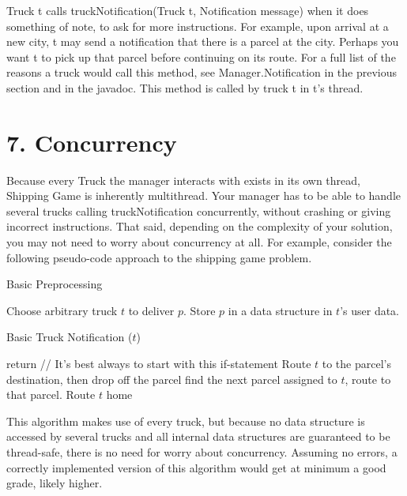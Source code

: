 \documentclass[11pt]{article}
\begin{document}
Truck t calls truckNotification(Truck t, Notification message) when it does something of note, to ask for more instructions. For example, upon arrival at a new city, t may send a notification that there is a parcel at the city. Perhaps you want t to pick up that parcel before continuing on its route. For a full list of the reasons a truck would call this method, see Manager.Notification in the previous section and in the javadoc. This method is called by truck t in t's thread. 

\section{7. Concurrency}
Because every Truck the manager interacts with exists in its own thread, Shipping Game is inherently multithread. Your manager has to be able to handle several trucks calling truckNotification concurrently, without crashing or giving incorrect instructions. That said, depending on the complexity of your solution, you may not need to worry about concurrency at all. For example, consider the following pseudo-code approach to the shipping game problem.
\begin{algorithm}
\caption{Basic Preprocessing} \label{alg:ls}
\begin{algorithmic}[1]
\STATE Choose arbitrary truck $t$ to deliver $p$. Store $p$ in a data structure in $t$'s user data.
\ENDFOR
\end{algorithmic}
\end{algorithm}
\begin{algorithm}
\caption{Basic Truck Notification ($t$)} \label{alg:ls}
\begin{algorithmic}[1]
\STATE return      // It's best always to start with this if-statement
\ENDIF
{}
\STATE Route $t$ to the parcel's destination, then drop off the parcel
\ELSE
\STATE find the next parcel assigned to $t$, route to that parcel.
\ENDIF
\ELSE
\STATE Route $t$ home
\ENDIF
\end{algorithmic}
\end{algorithm}

This algorithm makes use of every truck, but because no data structure is accessed by several trucks and all internal data structures are guaranteed to be thread-safe, there is no need for worry about concurrency. Assuming no errors, a correctly implemented version of this algorithm  would get at minimum a good grade, likely higher.\\
\end{document}

